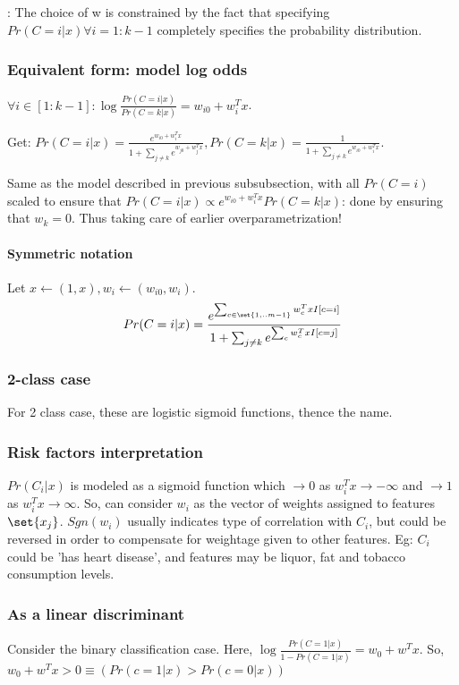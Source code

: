 \documentclass[oneside, article]{memoir}
\begin{document}
: The choice of w is constrained by the fact that specifying $Pr(C = i|x) \forall i=1:k-1$ completely specifies the probability distribution.

\subsubsection{Equivalent form: model log odds}
$\forall i\in [1:k-1]: \log\frac{Pr(C = i|x)}{Pr(C = k|x)} = w_{i0} + w_{i}^{T}x$.

Get: $Pr(C = i|x) = \frac{e^{w_{i0}+ w_{i}^{T}x}}{1 + \sum_{j \neq k} e^{w_{j0}+ w_{j}^{T}x}}, Pr(C = k|x) = \frac{1}{1 + \sum_{j\neq k} e^{w_{i0}+ w_{i}^{T}x}}$.

Same as the model described in previous subsubsection, with all $Pr(C = i)$ scaled to ensure that $Pr(C = i|x) \propto e^{w_{i0} + w_i^{T}x} Pr(C = k|x)$: done by ensuring that $w_k = 0$. Thus taking care of earlier overparametrization!

\paragraph*{Symmetric notation}
Let $x \gets (1, x), w_i \gets (w_{i0}, w_i)$. $$Pr(C = i|x) = \frac{e^{\sum_{c \in \set{1, .. m-1}} w_{c}^{T}x I[c=i]}}{1 + \sum_{j \neq k} e^{\sum_c w_{c}^{T}x I[c=j]}}$$

\subsubsection{2-class case}
For 2 class case, these are logistic sigmoid functions, thence the name.

\subsubsection{Risk factors interpretation}
$Pr(C_{i}|x)$ is modeled as a sigmoid function which $\to 0$ as $w_{i}^{T}x \to -\infty$ and $\to 1$ as $w_{i}^{T}x \to \infty$. So, can consider $w_{i}$ as the vector of weights assigned to features $\set{x_{j}}$. $Sgn(w_{i})$ usually indicates type of correlation with $C_{i}$, but could be reversed in order to compensate for weightage given to other features. Eg: $C_{i}$ could be 'has heart disease', and features may be liquor, fat and tobacco consumption levels.

\subsubsection{As a linear discriminant}
Consider the binary classification case. Here, $\log \frac{Pr(C = 1|x)}{1 - Pr(C = 1|x)} = w_0 + w^{T}x$. So, $w_0 + w^{T}x>0 \equiv (Pr(c=1|x) > Pr(c=0|x))$
\end{document}
